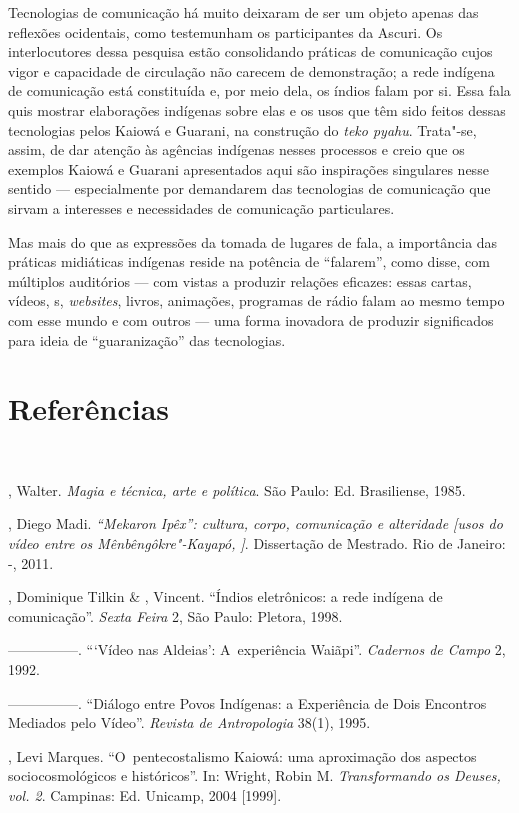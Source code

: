 Tecnologias de comunicação há muito deixaram de ser um objeto apenas das
reflexões ocidentais, como testemunham os participantes da Ascuri. Os
interlocutores dessa pesquisa estão consolidando práticas de
comunicação cujos vigor e capacidade de circulação não carecem de
demonstração; a rede indígena de comunicação está constituída e, por
meio dela, os índios falam por si. Essa fala quis mostrar elaborações
indígenas sobre elas e os usos que têm sido feitos dessas tecnologias
pelos Kaiowá e Guarani, na construção do \emph{teko pyahu}. Trata"-se, assim,
de dar atenção às agências indígenas nesses processos e creio que os
exemplos Kaiowá e Guarani apresentados aqui são inspirações singulares
nesse sentido --- especialmente por demandarem das tecnologias de
comunicação que sirvam a interesses e necessidades de comunicação
particulares. 

Mas mais do que as expressões da tomada de lugares de fala, a
importância das práticas midiáticas indígenas reside na potência de
``falarem'', como disse, com múltiplos auditórios --- com vistas a produzir
relações eficazes: essas cartas, vídeos, s, \emph{websites}, livros,
animações, programas de rádio falam ao mesmo tempo com esse mundo e com
outros --- uma forma inovadora de produzir significados para ideia de
``guaranização'' das tecnologias.

\section{Referências}\ \  \ \ 

\begin{Parskip}
, Walter. \emph{Magia e técnica, arte e política}. São Paulo: Ed.
Brasiliense, 1985.

, Diego Madi. \emph{``Mekaron Ipêx'': cultura, corpo, comunicação e
alteridade [usos do vídeo entre os Mênbêngôkre"-Kayapó, ]}. Dissertação
de Mestrado. Rio de Janeiro: -, 2011. 

, Dominique Tilkin \& , Vincent. ``Índios eletrônicos: a
rede indígena de comunicação''. \emph{Sexta Feira} 2, São Paulo: Pletora, 1998.


—————. ```Vídeo nas Aldeias': A~experiência Waiãpi''. \emph{Cadernos de Campo} 2,
1992.

—————. ``Diálogo entre Povos Indígenas: a Experiência de Dois Encontros
Mediados pelo Vídeo''. \emph{Revista de Antropologia} 38(1), 1995.

, Levi Marques. ``O~pentecostalismo Kaiowá: uma aproximação dos
aspectos sociocosmológicos e históricos''. In: Wright, Robin M.
\emph{Transformando os Deuses, vol. 2}. Campinas: Ed. Unicamp, 2004 [1999].
\end{Parskip}

